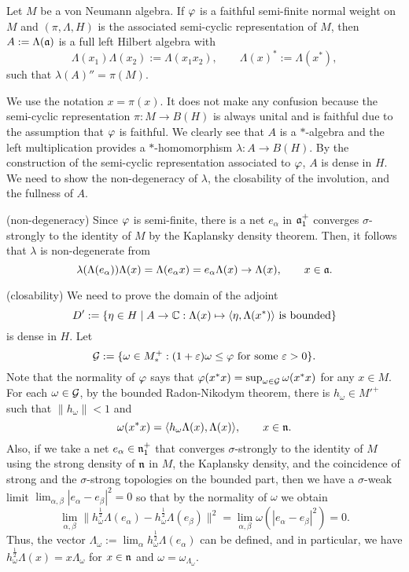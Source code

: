 \documentclass{../../../small}
\begin{document}
\begin{thm}
Let $M$ be a von Neumann algebra.
If $\varphi$ is a faithful semi-finite normal weight on $M$ and $(\pi,\Lambda,H)$ is the associated semi-cyclic representation of $M$, then $A:=\Lambda(\mathfrak{a})$ is a full left Hilbert algebra with
\[\Lambda(x_1)\Lambda(x_2):=\Lambda(x_1x_2),\qquad\Lambda(x)^*:=\Lambda(x^*),\]
such that $\lambda(A)''=\pi(M)$.
\end{thm}
\begin{pf}
We use the notation $x=\pi(x)$.
It does not make any confusion because the semi-cyclic representation $\pi:M\to B(H)$ is always unital and is faithful due to the assumption that $\varphi$ is faithful.
We clearly see that $A$ is a $*$-algebra and the left multiplication provides a $*$-homomorphism $\lambda:A\to B(H)$.
By the construction of the semi-cyclic representation associated to $\varphi$, $A$ is dense in $H$.
We need to show the non-degeneracy of $\lambda$, the closability of the involution, and the fullness of $A$.

(non-degeneracy)
Since $\varphi$ is semi-finite, there is a net $e_\alpha$ in $\mathfrak{a}_1^+$ converges $\sigma$-strongly to the identity of $M$ by the Kaplansky density theorem.
Then, it follows that $\lambda$ is non-degenerate from
\[\lambda(\Lambda(e_\alpha))\Lambda(x)=\Lambda(e_\alpha x)=e_\alpha\Lambda(x)\to\Lambda(x),\qquad x\in\mathfrak{a}.\]

(closability)
We need to prove the domain of the adjoint
\[D':=\{\eta\in H\mid A\to\mathbb{C}:\Lambda(x)\mapsto\langle\eta,\Lambda(x^*)\rangle\text{ is bounded}\}\]
is dense in $H$.
Let
\[\mathcal{G}:=\{\omega\in M_*^+:(1+\varepsilon)\omega\le\varphi\text{ for some }\varepsilon>0\}.\]
Note that the normality of $\varphi$ says that $\varphi(x^*x)=\sup_{\omega\in\mathcal{G}}\omega(x^*x)$ for any $x\in M$.
For each $\omega\in\mathcal{G}$, by the bounded Radon-Nikodym theorem, there is $h_\omega\in M'^+$ such that $\|h_\omega\|<1$ and
\[\omega(x^*x)=\langle h_\omega\Lambda(x),\Lambda(x)\rangle,\qquad x\in\mathfrak{n}.\]
Also, if we take a net $e_\alpha\in\mathfrak{n}_1^+$ that converges $\sigma$-strongly to the identity of $M$ using the strong density of $\mathfrak{n}$ in $M$, the Kaplansky density, and the coincidence of strong and the $\sigma$-strong topologies on the bounded part, then we have a $\sigma$-weak limit $\lim_{\alpha,\beta}|e_\alpha-e_\beta|^2=0$ so that by the normality of $\omega$ we obtain
\[\lim_{\alpha,\beta}\|h_\omega^{\frac12}\Lambda(e_\alpha)-h_\omega^{\frac12}\Lambda(e_\beta)\|^2=\lim_{\alpha,\beta}\omega(|e_\alpha-e_\beta|^2)=0.\]
Thus, the vector $\Lambda_\omega:=\lim_\alpha h_\omega^{\frac12}\Lambda(e_\alpha)$ can be defined, and in particular, we have $h_\omega^{\frac12}\Lambda(x)=x\Lambda_\omega$ for $x\in\mathfrak{n}$ and $\omega=\omega_{\Lambda_\omega}$.


\end{pf}
\end{document}
